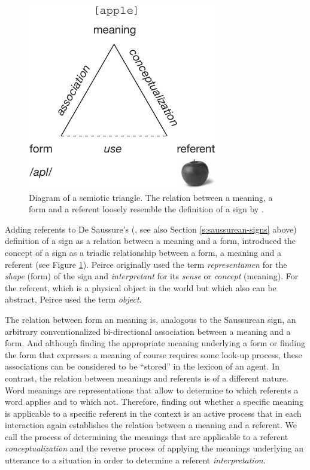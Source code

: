 \begin{figure}
  \parbox{0.6\textwidth}{\centerline{\includegraphics{figures/semiotic-triangle}}}
  \caption{Diagram of a semiotic triangle. The relation between a
    meaning, a form and a referent loosely resemble the definition of
    a sign by \cite{peirce31collected}. }
\label{f:semiotic-triangle}
\end{figure}


Adding referents to De Saussure's (\citeyear{saussure67cours}, see
also Section \ref{s:saussurean-signs} above) definition of a sign as a
relation between a meaning and a form, \cite{peirce31collected}
introduced the concept of a sign as a triadic relationship between a
form, a meaning and a referent (see Figure
\ref{f:semiotic-triangle}). Peirce originally used the term
\emph{representamen} for the \emph{shape} (form) of the sign and
\emph{interpretant} for its \emph{sense} or \emph{concept} (meaning).
For the referent, which is a physical object in the world but which
also can be abstract, Peirce used the term \emph{object}. 


The relation between form an meaning is, analogous to the Saussurean
sign, an arbitrary conventionalized bi-directional association between
a meaning and a form. And although finding the appropriate meaning
underlying a form or finding the form that expresses a meaning of
course requires some look-up process, these associations can be
considered to be ``stored'' in the lexicon of an agent. In contrast,
the relation between meanings and referents is of a different
nature. Word meanings are representations that allow to determine to
which referents a word applies and to which not. Therefore, finding
out whether a specific meaning is applicable to a specific referent in
the context is an active process that in each interaction again
establishes the relation between a meaning and a referent. We call the
process of determining the meanings that are applicable to a referent
\emph{conceptualization} and the reverse process of applying the
meanings underlying an utterance to a situation in order to determine
a referent \emph{interpretation}.


